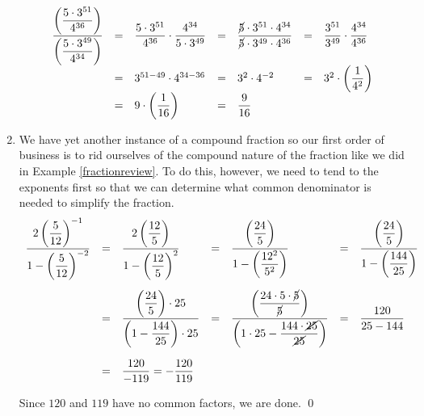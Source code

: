 \begin{ex}
\begin{enumerate}
\[\begin{array}{rclclcl}
\dfrac{\left(\dfrac{5\cdot 3^{51}}{4^{36}}\right)}{\left(\dfrac{5 \cdot 3^{49}}{4^{34}}\right)} & = & \dfrac{5\cdot 3^{51}}{4^{36}} \cdot \dfrac{4^{34}}{5 \cdot 3^{49}} & = & \dfrac{\cancel{5} \cdot 3^{51} \cdot 4^{34}}{\cancel{5} \cdot 3^{49} \cdot 4^{36}} & = & \dfrac{3^{51}}{3^{49}} \cdot\dfrac{4^{34}}{4^{36}} \\

& = & 3^{51-49} \cdot 4^{34-36} & = & 3^{2} \cdot 4^{-2} & = & 3^{2} \cdot \left( \dfrac{1}{4^2}\right) \\

& = & 9 \cdot \left(\dfrac{1}{16} \right) & = & \dfrac{9}{16} & & \\ \end{array} \]

\item We have yet another instance of a compound fraction so our first order of business is to rid ourselves of the compound nature of the fraction like we did in Example \ref{fractionreview}.  To do this, however, we need to tend to the exponents first so that we can determine what common denominator is needed to simplify the fraction.\[ \begin{array}{rclclcl} \dfrac{2 \left(\dfrac{5}{12}\right)^{-1}}{1 - \left(\dfrac{5}{12}\right)^{-2}} & = & \dfrac{2 \left(\dfrac{12}{5}\right)}{1 - \left(\dfrac{12}{5}\right)^{2}} & = & \dfrac{\left(\dfrac{24}{5}\right)}{1 - \left(\dfrac{12^2}{5^2}\right)} & = & \dfrac{\left(\dfrac{24}{5}\right)}{1 - \left(\dfrac{144}{25}\right)} \\ [30pt]

& = & \dfrac{\left(\dfrac{24}{5}\right) \cdot 25}{\left(1 - \dfrac{144}{25}\right)\cdot 25} & = & \dfrac{\left(\dfrac{24\cdot 5 \cdot \cancel{5}}{\cancel{5}}\right)}{\left(1 \cdot 25 - \dfrac{144 \cdot \cancel{25}}{\cancel{25}}\right)} & = & \dfrac{120}{25-144} \\ [30pt]
& = & \dfrac{120}{-119} = -\dfrac{120}{119} & & & & \\  \end{array} \]

Since $120$ and $119$ have no common factors, we are done.  \qed

\end{enumerate}

\end{ex}

\medskip

